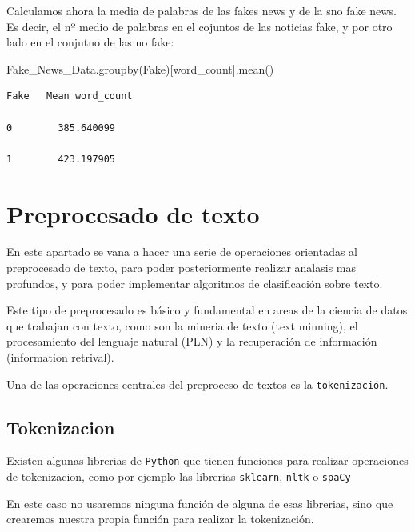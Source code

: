 \documentclass[
  11pt,
  a4paper,
]{article}
\newenvironment{Shaded}{\begin{snugshade}}{\end{snugshade}}
\newcommand{\NormalTok}[1]{#1}
\newcommand{\StringTok}[1]{\textcolor[rgb]{0.31,0.60,0.02}{#1}}
\begin{document}
Calculamos ahora la media de palabras de las fakes news y de la sno fake
news. Es decir, el nº medio de palabras en el cojuntos de las noticias
fake, y por otro lado en el conjutno de las no fake:

\begin{Shaded}
\begin{Highlighting}[]
\NormalTok{Fake\_News\_Data.groupby(}\StringTok{\textquotesingle{}Fake\textquotesingle{}}\NormalTok{)[}\StringTok{\textquotesingle{}word\_count\textquotesingle{}}\NormalTok{].mean()}
\end{Highlighting}
\end{Shaded}

\begin{verbatim}
Fake   Mean word_count

0        385.640099

1        423.197905
\end{verbatim}

\hypertarget{preprocesado-de-texto}{%
\section{Preprocesado de texto}\label{preprocesado-de-texto}}

En este apartado se vana a hacer una serie de operaciones orientadas al
preprocesado de texto, para poder posteriormente realizar analasis mas
profundos, y para poder implementar algoritmos de clasificación sobre
texto.

Este tipo de preprocesado es básico y fundamental en areas de la ciencia
de datos que trabajan con texto, como son la mineria de texto (text
minning), el procesamiento del lenguaje natural (PLN) y la recuperación
de información (information retrival).

Una de las operaciones centrales del preproceso de textos es la
\texttt{tokenización}.

\hypertarget{tokenizacion}{%
\subsection{Tokenizacion}\label{tokenizacion}}

Existen algunas librerias de \texttt{Python} que tienen funciones para
realizar operaciones de tokenizacion, como por ejemplo las librerias
\texttt{sklearn}, \texttt{nltk} o \texttt{spaCy}

En este caso no usaremos ninguna función de alguna de esas librerias,
sino que crearemos nuestra propia función para realizar la tokenización.
\end{document}
